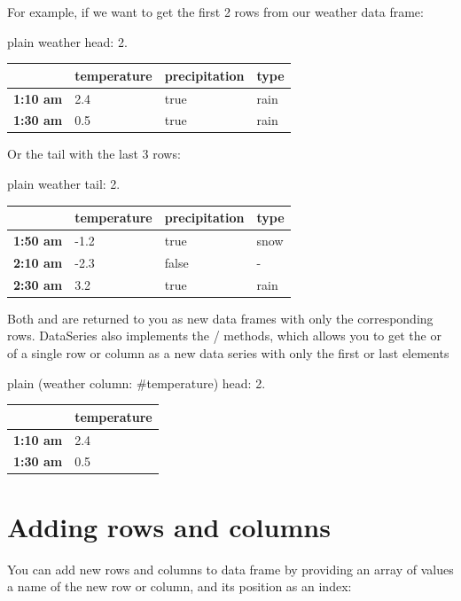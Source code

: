 \documentclass[10pt,twoside,english]{_support/latex/sbabook/sbabook}
\begin{document}
For example, if we want to get the first 2 rows from our weather data frame:

\begin{displaycode}{plain}
weather head: 2.
\end{displaycode}

\begin{tabular}{llll}
\toprule
 & \textbf{temperature} & \textbf{precipitation} & \textbf{type} \\
\midrule
\textbf{1:10 am} & 2.4 & true & rain \\
\textbf{1:30 am} & 0.5 & true & rain \\
\bottomrule
\end{tabular}

Or the tail with the last 3 rows:

\begin{displaycode}{plain}
weather tail: 2.
\end{displaycode}

\begin{tabular}{llll}
\toprule
 & \textbf{temperature} & \textbf{precipitation} & \textbf{type} \\
\midrule
\textbf{1:50 am} & -1.2 & true & snow \\
\textbf{2:10 am} & -2.3 & false & - \\
\textbf{2:30 am} & 3.2 & true & rain \\
\bottomrule
\end{tabular}

Both  and  are returned to you as new data frames with only the corresponding rows. DataSeries also implements the / methods, which allows you to get the  or  of a single row or column as a new data series with only the first or last elements

\begin{displaycode}{plain}
(weather column: #temperature) head: 2.
\end{displaycode}

\begin{tabular}{ll}
\toprule
 & \textbf{temperature} \\
\midrule
\textbf{1:10 am} & 2.4 \\
\textbf{1:30 am} & 0.5 \\
\bottomrule
\end{tabular}
\section{Adding rows and columns}\label{secAddingRowsAndColumns}
You can add new rows and columns to data frame by providing an array of values a name of the new row or column, and its position as an index:
\end{document}
